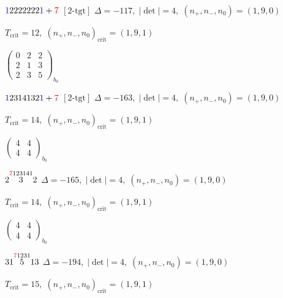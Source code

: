 \documentclass[10pt]{article}
\begin{document}
\smallskip

$\textcolor{blue}{1}2222222\textcolor{blue}{1}+\textcolor{red}{7}$ $\scriptstyle [2\text{-tgt}]$ \quad $\Delta=-117,\; |\det|=4,\; (n_+,n_-,n_0)=(1,9,0)$

\hspace{1em}$T_{\text{crit}}=12,\; (n_+,n_-,n_0)_{\text{crit}}=(1,9,1)$

\hspace{2em}$\left(\begin{smallmatrix}0 & 2 & 2 \\ 2 & 1 & 3 \\ 2 & 3 & 5\end{smallmatrix}\right)_{\!b_0}$

\smallskip

$\textcolor{blue}{1}2314132\textcolor{blue}{1}+\textcolor{red}{7}$ $\scriptstyle [2\text{-tgt}]$ \quad $\Delta=-163,\; |\det|=4,\; (n_+,n_-,n_0)=(1,9,0)$

\hspace{1em}$T_{\text{crit}}=14,\; (n_+,n_-,n_0)_{\text{crit}}=(1,9,1)$

\hspace{2em}$\left(\begin{smallmatrix}4 & 4 \\ 4 & 4\end{smallmatrix}\right)_{\!b_0}$

\smallskip

$2\overset{\textcolor{red}{7}123141}{3}2$ \quad $\Delta=-165,\; |\det|=4,\; (n_+,n_-,n_0)=(1,9,0)$

\hspace{1em}$T_{\text{crit}}=14,\; (n_+,n_-,n_0)_{\text{crit}}=(1,9,1)$

\hspace{2em}$\left(\begin{smallmatrix}4 & 4 \\ 4 & 4\end{smallmatrix}\right)_{\!b_0}$

\smallskip

$31\overset{\textcolor{red}{7}1231}{5}13$ \quad $\Delta=-194,\; |\det|=4,\; (n_+,n_-,n_0)=(1,9,0)$

\hspace{1em}$T_{\text{crit}}=15,\; (n_+,n_-,n_0)_{\text{crit}}=(1,9,1)$
\end{document}
